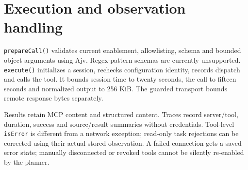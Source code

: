\section*{Execution and observation handling}
\texttt{prepareCall()} validates current enablement, allowlisting, schema and bounded object arguments using Ajv. Regex-pattern schemas are currently unsupported. \texttt{execute()} initializes a session, rechecks configuration identity, records dispatch and calls the tool. It bounds session time to twenty seconds, the call to fifteen seconds and normalized output to 256 KiB. The guarded transport bounds remote response bytes separately.

Results retain MCP content and structured content. Traces record server/tool, duration, success and source/result summaries without credentials. Tool-level \texttt{isError} is different from a network exception; read-only task rejections can be corrected using their actual stored observation. A failed connection gets a saved error state; manually disconnected or revoked tools cannot be silently re-enabled by the planner.
